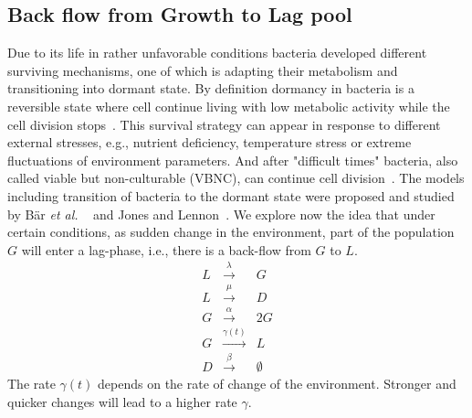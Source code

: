 \documentclass[10pt,A4paper]{article}
\numberwithin{equation}{section}
\newcommand{\etal}{{\textit{et al. }}}
\begin{document}
\subsection{Back flow from Growth to Lag pool}
Due to its life in rather unfavorable conditions bacteria developed different surviving mechanisms, one of which is adapting their metabolism and transitioning into dormant state.
By definition dormancy in bacteria is a reversible state where cell continue living with low metabolic activity while the cell division stops~\cite{kaprelyants_dormancy_1993}.
This survival strategy can appear in response to different external stresses, e.g., nutrient deficiency, temperature stress or extreme fluctuations of environment parameters.
And after "difficult times" bacteria, also called viable but non-culturable (VBNC), can continue cell division~\cite{kell_viability_1998}.
The models including transition of bacteria to the dormant state were proposed and studied by Bär \etal~\cite{bar_modelling_2002} and Jones and Lennon~\cite{jones_dormancy_2010}.
%
We explore now the idea that under certain conditions, as sudden change in the environment, part of the population $G$ will enter a lag-phase, i.e., there is a back-flow from $G$ to $L$.
\begin{eqnarray}
    L &\stackrel{\lambda}{\longrightarrow} & G\\
    L &\stackrel{\mu}{\longrightarrow} & D\\
    G &\stackrel{\alpha}{\longrightarrow} & 2G\\
    G &\stackrel{\gamma(t)}{\longrightarrow} & L\\
    D &\stackrel{\beta}{\longrightarrow} & \emptyset
\label{eq:reactions_backlag}
\end{eqnarray}
The rate $\gamma(t)$ depends on the rate of change of the environment.
Stronger and quicker changes will lead to a higher rate $\gamma$.
%
%
\end{document}
